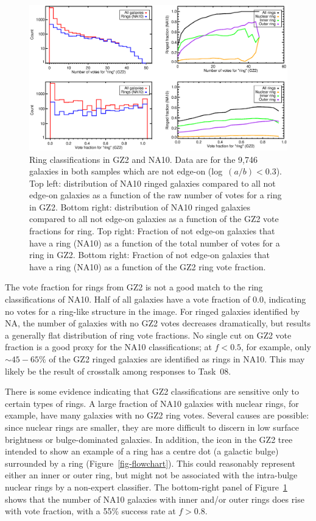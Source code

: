 \documentclass[useAMS,usenatbib]{mn2e}
\begin{document}
\begin{figure}
\includegraphics[angle=0,width=7.0in]{figures/na_rings_axial.eps}
\caption{Ring classifications in GZ2 and NA10. Data are for the 9,746 galaxies in both samples which are not edge-on (log~$(a/b)<0.3$). Top left: distribution of NA10 ringed galaxies compared to all not edge-on galaxies as a function of the raw number of votes for a ring in GZ2. Bottom right: distribution of NA10 ringed galaxies compared to all not edge-on galaxies as a function of the GZ2 vote fractions for ring. Top right: Fraction of not edge-on galaxies that have a ring (NA10) as a function of the total number of votes for a ring in GZ2. Bottom right: Fraction of not edge-on galaxies that have a ring (NA10) as a function of the GZ2 ring vote fraction. 
\label{fig-na_rings}}
\end{figure}

The vote fraction for rings from GZ2 is not a good match to the ring classifications of NA10. Half of all galaxies have a vote fraction of 0.0, indicating no votes for a ring-like structure in the image. For ringed galaxies identified by NA, the number of galaxies with no GZ2 votes decreases dramatically, but results a generally flat distribution of ring vote fractions. No single cut on GZ2 vote fraction is a good proxy for the NA10 classifications; at $f<0.5$, for example, only $\sim45-65\%$ of the GZ2 ringed galaxies are identified as rings in NA10. This may likely be the result of crosstalk among responses to Task~08. 

There is some evidence indicating that GZ2 classifications are sensitive only to certain types of rings. A large fraction of NA10 galaxies with nuclear rings, for example, have many galaxies with no GZ2 ring votes. Several causes are possible: since nuclear rings are smaller, they are more difficult to discern in low surface brightness or bulge-dominated galaxies. In addition, the icon in the GZ2 tree intended to show an example of a ring has a centre dot (a galactic bulge) surrounded by a ring (Figure~\ref{fig-flowchart}). This could reasonably represent either an inner or outer ring, but might not be associated with the intra-bulge nuclear rings by a non-expert classifier. The bottom-right panel of Figure~\ref{fig-na_rings} shows that the number of NA10 galaxies with inner and/or outer rings does rise with vote fraction, with a 55\% success rate at $f > 0.8$. 
\end{document}
